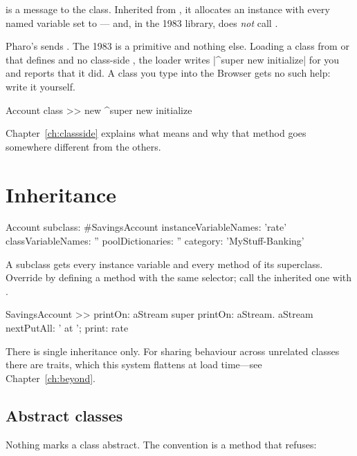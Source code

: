  is a message to the class. Inherited from , it allocates
an instance with every named variable set to  --- and, in the 1983
library, does \emph{not} call .

\begin{stwarn}
Pharo's  sends . The 1983
 is a primitive and nothing else. Loading a class from
 or  that defines  and no class-side
, the loader writes \ct|^super new initialize| for you and reports
that it did. A class you type into the Browser gets no such help: write it
yourself.
\end{stwarn}

\begin{st}
Account class >> new
    ^super new initialize
\end{st}

Chapter~\ref{ch:classside} explains what  means and why that
method goes somewhere different from the others.

\section{Inheritance}

\begin{st}
Account subclass: #SavingsAccount
    instanceVariableNames: 'rate'
    classVariableNames: ''
    poolDictionaries: ''
    category: 'MyStuff-Banking'
\end{st}

A subclass gets every instance variable and every method of its superclass.
Override by defining a method with the same selector; call the inherited one
with .

\begin{st}
SavingsAccount >> printOn: aStream
    super printOn: aStream.
    aStream nextPutAll: ' at '; print: rate
\end{st}

There is single inheritance only. For sharing behaviour across unrelated
classes there are traits, which this system flattens at load time---see
Chapter~\ref{ch:beyond}.

\subsection{Abstract classes}

Nothing marks a class abstract. The convention is a method that refuses:

